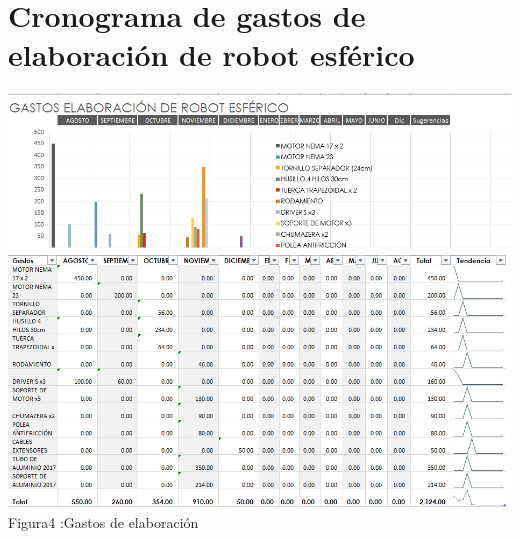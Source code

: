 \documentclass[12pt,a4paper]{report}
\begin{document}
\section{Cronograma de gastos de elaboración de robot esférico}
 
\begin{center}
\includegraphics[width=16cm]{2019-10-18.png}
 Figura4 :Gastos de elaboración
\end{center}
    
\end{document}
